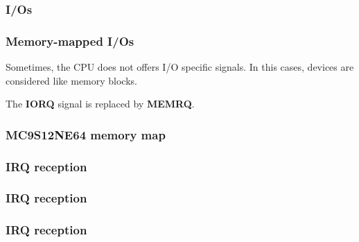 
\begin{frame}
  \frametitle{I/Os}

  \begin{center}
  \end{center}

\end{frame}


\begin{frame}
  \frametitle{Memory-mapped I/Os}

  Sometimes, the CPU does not offers I/O specific signals. In this
  cases, devices are considered like memory blocks.

  \-

  The \textbf{IORQ} signal is replaced by \textbf{MEMRQ}.

\end{frame}


\begin{frame}
  \frametitle{MC9S12NE64 memory map}

  \begin{center}
  \end{center}

\end{frame}


\begin{frame}
  \frametitle{IRQ reception}

  \begin{center}
  \end{center}

\end{frame}


\begin{frame}
  \frametitle{IRQ reception}

  \begin{center}
  \end{center}

\end{frame}


\begin{frame}
  \frametitle{IRQ reception}

  \begin{center}
  \end{center}

\end{frame}

